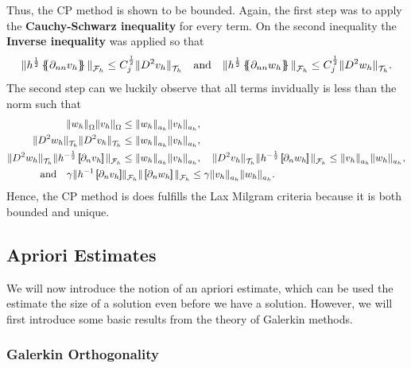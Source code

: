 Thus, the CP method is shown to be bounded.
Again, the first step was to apply the \textbf{Cauchy-Schwarz inequality} for every term. On the second inequality the \textbf{Inverse inequality} was applied so that
\[
\| h^{\frac{1}{2}} \mean{ \partial _{nn}v_{h} }   \|_{ \mathcal{F} _{h}  }^{  }\le   C_{j}^{\frac{1}{2}} \| D ^2 v_{h} \|_{ \mathcal{T} _{h} }^{  } \quad \text{and} \quad   \| h^{\frac{1}{2}} \mean{ \partial _{nn}w_{h} }   \|_{ \mathcal{F} _{h}
}^{  }\le   C_{j}^{\frac{1}{2}} \| D ^2 w_{h} \|_{ \mathcal{T} _{h} }^{  }.
\]
The second step can we luckily observe that all terms invidually is less than the norm such that
\begin{equation}
\label{eq:bounded_ineq}
\begin{split}
\| w_{h} \|_{\Omega    }^{  }  \| v_{h} \|_{ \Omega    }^{  } & \le \| w_{h} \|_{ a_{h} }^{  } \| v_{h} \|_{ a_{h} }^{  }, \\
\| D ^2w_{h} \|_{\mathcal{T}_{h}   }^{  }  \| D ^2v_{h} \|_{\mathcal{T}_{h}   }^{  } & \le \| w_{h} \|_{ a_{h} }^{  } \| v_{h} \|_{ a_{h} }^{  }, \\
\|  D ^2 w_{h} \|_{ \mathcal{T} _{h} }^{ } \| h^{-\frac{1}{2}} \jump{ \partial _{n} v_{h} }   \|_{ \mathcal{F} _{h} }^{  }  & \le  \| w_{h} \|_{ a_{h} }^{  } \| v_{h} \|_{ a_{h} }^{  }, \quad  \|  D ^2 v_{h} \|_{ \mathcal{T} _{h} }^{ } \| h^{-\frac{1}{2}} \jump{ \partial _{n} w_{h} }   \|_{ \mathcal{F} _{h} }^{  }   \le \| v_{h} \|_{ a_{h} }^{  } \| w_{h} \|_{ a_{h} }^{  }, \\
\text{and} \quad    \gamma \| h^{-1 } \jump{ \partial _{n} v_{h} }   & \|_{ \mathcal{F} _{h}  }^{  }  \| \jump{ \partial _{n} w_{h} }    \|_{\mathcal{F}_{h}   }^{  }   \le \gamma \| v_{h} \|_{ a_{h} }^{  }  \| w_{h} \|_{ a_{h} }^{  }.
\end{split}
\end{equation}
Hence, the CP method is does fulfills the Lax Milgram criteria because it is both bounded and unique.


\subsection{Apriori Estimates}%
\label{sub:apriori_estimates}

We will now introduce the notion of an apriori estimate, which can be used the estimate the size of a solution even before we have a solution. However, we will first introduce some basic results from the theory of Galerkin methods.

\subsubsection{Galerkin Orthogonality}%
\label{ssub:galerkin_orthonality}

